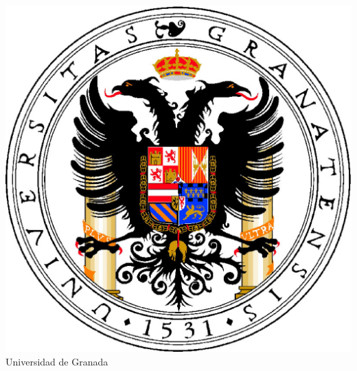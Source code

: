 \documentclass[b5paper,twoside,10pt]{book}
\begin{document}
\hfill
\begin{minipage}[t]{.23\textwidth}
\centering
\includegraphics[width=.83\textwidth]{escudo_ugr_portada.eps}
 Universidad de Granada
\end{minipage}
\end{document}
